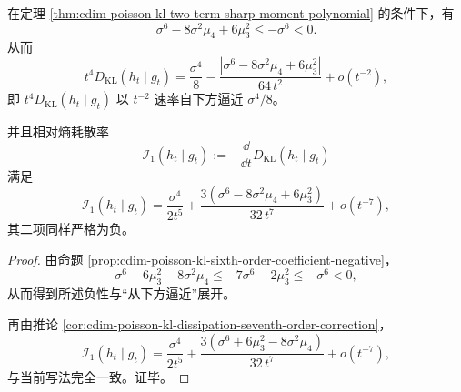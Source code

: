 \begin{proposition}\label{prop:cdim-poisson-kl-sixth-term-negative-and-dissipation-restated}
在定理 \ref{thm:cdim-poisson-kl-two-term-sharp-moment-polynomial} 的条件下，有
\[
\sigma^6-8\sigma^2\mu_4+6\mu_3^2\le -\sigma^6<0.
\]
从而
\[
t^4D_{\mathrm{KL}}(h_t\mid g_t)
=\frac{\sigma^4}{8}
-\frac{|\sigma^6-8\sigma^2\mu_4+6\mu_3^2|}{64\,t^2}
+o(t^{-2}),
\]
即 \(t^4D_{\mathrm{KL}}(h_t\mid g_t)\) 以 \(t^{-2}\) 速率自下方逼近 \(\sigma^4/8\)。

并且相对熵耗散率
\[
\mathcal I_1(h_t\mid g_t):=-\frac{\dd}{\dd t}D_{\mathrm{KL}}(h_t\mid g_t)
\]
满足
\[
\mathcal I_1(h_t\mid g_t)
=\frac{\sigma^4}{2t^5}
+\frac{3(\sigma^6-8\sigma^2\mu_4+6\mu_3^2)}{32\,t^7}
+o(t^{-7}),
\]
其二项同样严格为负。
\end{proposition}
\begin{proof}
由命题 \ref{prop:cdim-poisson-kl-sixth-order-coefficient-negative}，
\[
\sigma^6+6\mu_3^2-8\sigma^2\mu_4
\le -7\sigma^6-2\mu_3^2
\le -\sigma^6<0,
\]
从而得到所述负性与“从下方逼近”展开。

再由推论 \ref{cor:cdim-poisson-kl-dissipation-seventh-order-correction}，
\[
\mathcal I_1(h_t\mid g_t)
=\frac{\sigma^4}{2t^5}
+\frac{3(\sigma^6+6\mu_3^2-8\sigma^2\mu_4)}{32\,t^7}
+o(t^{-7}),
\]
与当前写法完全一致。证毕。
\end{proof}

